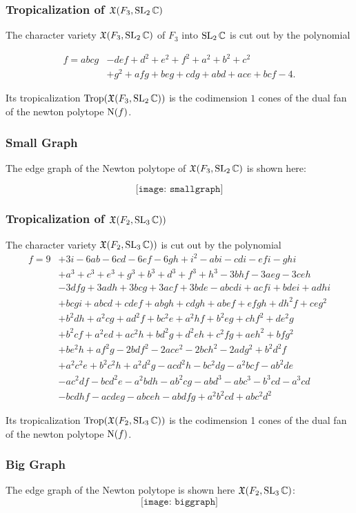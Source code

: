 \begin{frame}
  \frametitle{Tropicalization of $\mathfrak{X}(F_3,\operatorname{SL}_2\mathbb{C})$}
  The character variety $\mathfrak{X}(F_3, \operatorname{SL}_2\mathbb{C})$ of $F_3$ into $\operatorname{SL}_2\mathbb{C}$
  is cut out by the polynomial

  \[
    \begin{aligned}
      f=abcg &- def +d^2 + e^2 + f^2 + a^2 + b^2 + c^2 \\
      &+ g^2 + afg + beg + cdg + abd + ace + bcf - 4.
  \end{aligned}
  \]

  Its tropicalization $\operatorname{Trop}(\mathfrak{X}(F_3,\operatorname{SL}_2\mathbb{C}))$ is the codimension $1$
  cones of the dual fan of the newton polytope $\mathrm{N}(f)$.
\end{frame}
\begin{frame}
  \frametitle{Small Graph}
  The edge graph of the Newton polytope of $\mathfrak{X}(F_3,\operatorname{SL}_2\mathbb{C})$ is shown
  here:

\[
  \texttt{[image: smallgraph]}
\]
\end{frame}

\begin{frame}
  \frametitle{Tropicalization of  $\mathfrak{X}(F_2, \operatorname{SL}_3\mathbb{C}))$}
  The character variety $\mathfrak{X}(F_2, \operatorname{SL}_3\mathbb{C}))$ is cut out by the
  polynomial
  {\tiny
  \[
    \begin{aligned}
      f= 9 &+ 3i - 6ab - 6cd - 6ef - 6gh + i^2 - abi - cdi - efi - ghi\\
      &+a^3 + c^3 + e^3 + g^3 + b^3 + d^3 + f^3 + h^3 - 3bhf - 3aeg - 3ceh\\
      &-3dfg + 3adh + 3bcg + 3acf + 3bde - abcdi + acfi + bdei + adhi\\
      &+bcgi + abcd + cdef + abgh + cdgh + abef + efgh + dh^2f + ceg^2\\
      &+ b^2dh + a^2cg + ad^2f + bc^2e + a^2hf + b^2eg + chf^2 + de^2g \\
      &+ b^2cf + a^2ed + ac^2h + bd^2g + d^2eh + c^2fg + aeh^2 + bfg^2 \\
      &+ be^2h + af^2g - 2bdf^2 - 2ace^2 - 2bch^2 - 2adg^2 + b^2d^2f \\
      &+ a^2c^2e + b^2c^2h + a^2d^2g - acd^2h - bc^2dg - a^2bcf - ab^2de \\
      &- ac^2df - bcd^2e - a^2bdh - ab^2cg - abd^3 - abc^3 - b^3cd - a^3cd
      \\
      &- bcdhf - acdeg - abceh - abdfg + a^2b^2cd + abc^2d^2
    \end{aligned}
  \]
  }

Its tropicalization $\operatorname{Trop}(\mathfrak{X}(F_2,\operatorname{SL}_3\mathbb{C}))$ is the codimension 1
cones of the dual fan of the newton polytope $\mathrm{N}(f)$.
\end{frame}
\begin{frame}
  \frametitle{Big Graph}
  The edge graph of the Newton polytope is shown here
  $\mathfrak{X}(F_2,\operatorname{SL}_3\mathbb{C})$:
\[
  \texttt{[image: biggraph]}
\]
\end{frame}

